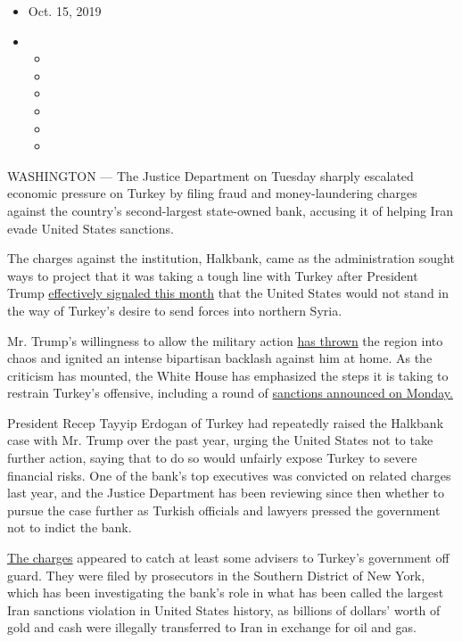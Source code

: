 \begin{itemize}
\item
  Oct. 15, 2019
\item
  \begin{itemize}
  \item
  \item
  \item
  \item
  \item
  \item
  \end{itemize}
\end{itemize}

WASHINGTON --- The Justice Department on Tuesday sharply escalated
economic pressure on Turkey by filing fraud and money-laundering charges
against the country's second-largest state-owned bank, accusing it of
helping Iran evade United States sanctions.

The charges against the institution, Halkbank, came as the
administration sought ways to project that it was taking a tough line
with Turkey after President Trump
\href{https://www.nytimes.com/2019/10/07/us/politics/trump-turkey-syria.html}{effectively
signaled this month} that the United States would not stand in the way
of Turkey's desire to send forces into northern Syria.

Mr. Trump's willingness to allow the military action
\href{https://www.nytimes.com/2019/10/11/us/politics/turkey-sanctions-syria-kurds-trump.html}{has
thrown} the region into chaos and ignited an intense bipartisan backlash
against him at home. As the criticism has mounted, the White House has
emphasized the steps it is taking to restrain Turkey's offensive,
including a round of
\href{https://www.nytimes.com/2019/10/14/us/politics/trump-turkey-tariffs.html}{sanctions
announced on Monday.}

President Recep Tayyip Erdogan of Turkey had repeatedly raised the
Halkbank case with Mr. Trump over the past year, urging the United
States not to take further action, saying that to do so would unfairly
expose Turkey to severe financial risks. One of the bank's top
executives was convicted on related charges last year, and the Justice
Department has been reviewing since then whether to pursue the case
further as Turkish officials and lawyers pressed the government not to
indict the bank.

\href{https://www.documentcloud.org/documents/6475078-2019-10-15-U-S-v-Halkbank-Indictment.html}{The
charges} appeared to catch at least some advisers to Turkey's government
off guard. They were filed by prosecutors in the Southern District of
New York, which has been investigating the bank's role in what has been
called the largest Iran sanctions violation in United States history, as
billions of dollars' worth of gold and cash were illegally transferred
to Iran in exchange for oil and gas.

